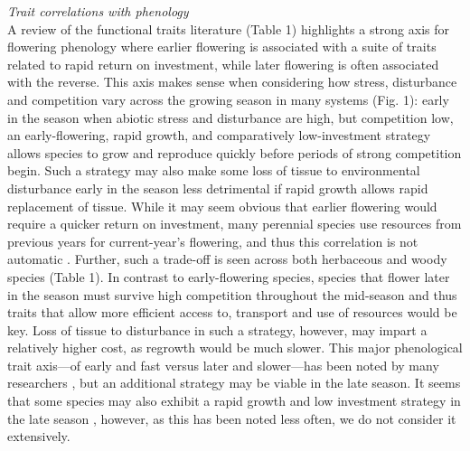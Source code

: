 \documentclass[11pt,a4paper,oneside]{article}
\begin{document}
\noindent \emph{Trait correlations with phenology}\\
\noindent A review of the functional traits literature (Table 1) highlights a strong axis for flowering phenology where earlier flowering is associated with a suite of traits related to rapid return on investment, while later flowering is often associated with the reverse. This axis makes sense when considering how stress, disturbance and competition vary across the growing season in many systems (Fig. 1): early in the season when abiotic stress and disturbance are high, but competition low, an early-flowering, rapid growth, and comparatively low-investment strategy allows species to grow and reproduce quickly before periods of strong competition begin. Such a strategy may also make some loss of tissue to environmental disturbance early in the season less detrimental if rapid growth allows rapid replacement of tissue. While it may seem obvious that earlier flowering would require a quicker return on investment, many perennial species use resources from previous years for current-year's flowering, and thus this correlation is not automatic \citep{muller1978}. Further, such a trade-off is seen across both herbaceous and woody species (Table 1). In contrast to early-flowering species, species that flower later in the season must survive high competition throughout the mid-season and thus traits that allow more efficient access to, transport and use of resources would be key. Loss of tissue to disturbance in such a strategy, however, may impart a relatively higher cost, as regrowth would be much slower. This major phenological trait axis---of early and fast versus later and slower---has been noted by many researchers \citep[e.g.,][]{Lechowicz:1984cr,Sun:2011eu}, but an additional strategy may be viable in the late season. It seems that some species may also exhibit a rapid growth and low investment strategy in the late season \citep{Sun:2011eu}, however, as this has been noted less often, we do not consider it extensively.
\end{document}
